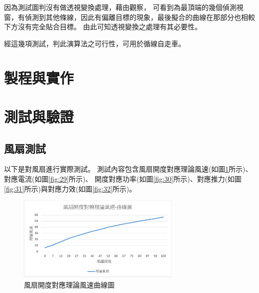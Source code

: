 \documentclass[12pt]{article}       %
\begin{document}
因為測試圖判沒有做透視變換處理，藉由觀察，
可看到為最頂端的幾個偵測視窗，有偵測到其他條線，因此有偏離目標的現象，最後擬合的曲線在那部分也相較下方沒有完全貼合目標。
由此可知透視變換之處理有其必要性。

經這幾項測試，判此演算法之可行性，可用於循線自走車。

\section{\centering 製程與實作}
\hspace{2em}


\section{\centering 測試與驗證}

\subsection{風扇測試} 
\hspace{2em}以下是對風扇進行實際測試。
測試內容包含風扇開度對應理論風速(如圖\ref{fig:28}所示)、對應電流(如圖\ref{fig:29}所示)、
開度對應功率(如圖\ref{fig:30}所示)、對應推力(如圖\ref{fig:31}所示)與對應力效(如圖\ref{fig:32}所示)。

\begin{figure}[H]
    \centering
    \includegraphics[width=0.7\textwidth]{28.jpg}     %
    \caption{風扇開度對應理論風速曲線圖}    %
    \label{fig:28}    %
\end{figure}
\end{document}

